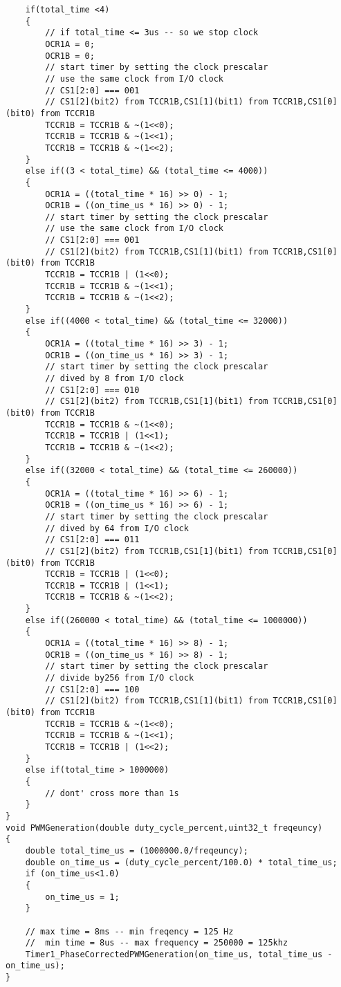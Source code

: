 \documentclass{article}
\begin{document}
\begin{verbatim}
    if(total_time <4)
    {
        // if total_time <= 3us -- so we stop clock
        OCR1A = 0;
        OCR1B = 0;
        // start timer by setting the clock prescalar
        // use the same clock from I/O clock
        // CS1[2:0] === 001
        // CS1[2](bit2) from TCCR1B,CS1[1](bit1) from TCCR1B,CS1[0](bit0) from TCCR1B
        TCCR1B = TCCR1B & ~(1<<0);
        TCCR1B = TCCR1B & ~(1<<1);
        TCCR1B = TCCR1B & ~(1<<2);
    }
    else if((3 < total_time) && (total_time <= 4000))
    {
        OCR1A = ((total_time * 16) >> 0) - 1;
        OCR1B = ((on_time_us * 16) >> 0) - 1;
        // start timer by setting the clock prescalar
        // use the same clock from I/O clock
        // CS1[2:0] === 001
        // CS1[2](bit2) from TCCR1B,CS1[1](bit1) from TCCR1B,CS1[0](bit0) from TCCR1B
        TCCR1B = TCCR1B | (1<<0);
        TCCR1B = TCCR1B & ~(1<<1);
        TCCR1B = TCCR1B & ~(1<<2);
    }
    else if((4000 < total_time) && (total_time <= 32000))
    {
        OCR1A = ((total_time * 16) >> 3) - 1;
        OCR1B = ((on_time_us * 16) >> 3) - 1;
        // start timer by setting the clock prescalar
        // dived by 8 from I/O clock
        // CS1[2:0] === 010
        // CS1[2](bit2) from TCCR1B,CS1[1](bit1) from TCCR1B,CS1[0](bit0) from TCCR1B
        TCCR1B = TCCR1B & ~(1<<0);
        TCCR1B = TCCR1B | (1<<1);
        TCCR1B = TCCR1B & ~(1<<2);
    }
    else if((32000 < total_time) && (total_time <= 260000))
    {
        OCR1A = ((total_time * 16) >> 6) - 1;
        OCR1B = ((on_time_us * 16) >> 6) - 1;
        // start timer by setting the clock prescalar
        // dived by 64 from I/O clock
        // CS1[2:0] === 011
        // CS1[2](bit2) from TCCR1B,CS1[1](bit1) from TCCR1B,CS1[0](bit0) from TCCR1B
        TCCR1B = TCCR1B | (1<<0);
        TCCR1B = TCCR1B | (1<<1);
        TCCR1B = TCCR1B & ~(1<<2);
    }
    else if((260000 < total_time) && (total_time <= 1000000))
    {
        OCR1A = ((total_time * 16) >> 8) - 1;
        OCR1B = ((on_time_us * 16) >> 8) - 1;
        // start timer by setting the clock prescalar
        // divide by256 from I/O clock
        // CS1[2:0] === 100
        // CS1[2](bit2) from TCCR1B,CS1[1](bit1) from TCCR1B,CS1[0](bit0) from TCCR1B
        TCCR1B = TCCR1B & ~(1<<0);
        TCCR1B = TCCR1B & ~(1<<1);
        TCCR1B = TCCR1B | (1<<2);
    }
    else if(total_time > 1000000)
    {
        // dont' cross more than 1s
    }
}
void PWMGeneration(double duty_cycle_percent,uint32_t freqeuncy)
{
    double total_time_us = (1000000.0/freqeuncy);	
    double on_time_us = (duty_cycle_percent/100.0) * total_time_us;
    if (on_time_us<1.0)
    {
        on_time_us = 1;
    }
    
    // max time = 8ms -- min freqency = 125 Hz
    //  min time = 8us -- max frequency = 250000 = 125khz
    Timer1_PhaseCorrectedPWMGeneration(on_time_us, total_time_us - on_time_us);
}
\end{verbatim}
\end{document}
